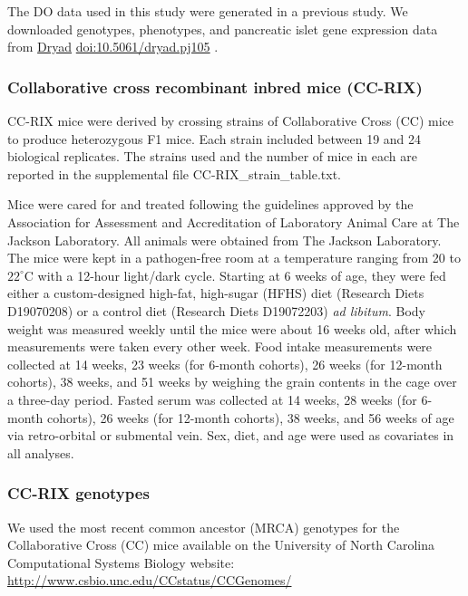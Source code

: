 \documentclass[
]{article}
\begin{document}
The DO data used in this study were generated in a previous
study\cite{pmid31343992, pmid29567659}. We downloaded genotypes,
phenotypes, and pancreatic islet gene expression data from
\href{https://datadryad.org/}{Dryad}
\href{https://datadryad.org/dataset/doi:10.5061/dryad.pj105}{doi:10.5061/dryad.pj105}
\cite{DO_data}.

\subsubsection{Collaborative cross recombinant inbred mice
(CC-RIX)}\label{collaborative-cross-recombinant-inbred-mice-cc-rix}

CC-RIX mice were derived by crossing strains of Collaborative Cross (CC)
mice to produce heterozygous F1 mice. Each strain included between 19
and 24 biological replicates. The strains used and the number of mice in
each are reported in the supplemental file CC-RIX\_strain\_table.txt.

Mice were cared for and treated following the guidelines approved by the
Association for Assessment and Accreditation of Laboratory Animal Care
at The Jackson Laboratory. All animals were obtained from The Jackson
Laboratory. The mice were kept in a pathogen-free room at a temperature
ranging from 20 to \(22^{\circ}\)C with a 12-hour light/dark cycle.
Starting at 6 weeks of age, they were fed either a custom-designed
high-fat, high-sugar (HFHS) diet (Research Diets D19070208) or a control
diet (Research Diets D19072203) \textit{ad 
libitum}. Body weight was measured weekly until the mice were about 16
weeks old, after which measurements were taken every other week. Food
intake measurements were collected at 14 weeks, 23 weeks (for 6-month
cohorts), 26 weeks (for 12-month cohorts), 38 weeks, and 51 weeks by
weighing the grain contents in the cage over a three-day period. Fasted
serum was collected at 14 weeks, 28 weeks (for 6-month cohorts), 26
weeks (for 12-month cohorts), 38 weeks, and 56 weeks of age via
retro-orbital or submental vein. Sex, diet, and age were used as
covariates in all analyses.

\subsubsection{CC-RIX genotypes}\label{cc-rix-genotypes}

We used the most recent common ancestor (MRCA) genotypes for the
Collaborative Cross (CC) mice available on the University of North
Carolina Computational Systems Biology website:
\url{http://www.csbio.unc.edu/CCstatus/CCGenomes/}
\end{document}
